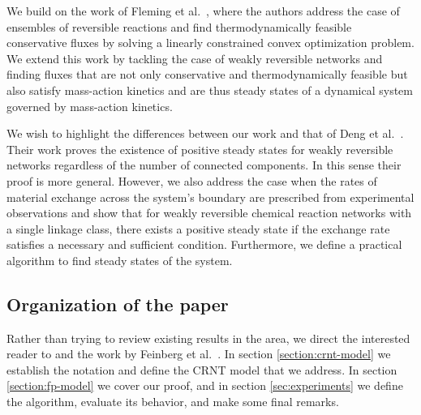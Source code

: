 \documentclass[smallextended]{svjour3}       %
\newcounter{sent}
\newcommand*{\0}{\mathbf{0}}
\newcommand*{\1}{\mathbf{1}}
\newcommand*{\R}{\mathbbm{R}}
\begin{document}
We build on the work of Fleming et al.\ \cite{fleming-opt}, where the authors
address the case of ensembles of reversible reactions and find
thermodynamically feasible conservative fluxes by solving a linearly 
constrained convex optimization problem. We extend this work by tackling the case
of weakly reversible networks and finding fluxes that are not only conservative
and thermodynamically feasible but also satisfy mass-action kinetics and 
are thus steady states of a dynamical system governed by mass-action kinetics.

We wish to highlight the differences between our work and that of Deng et al.\ 
\cite{Deng}. Their work proves the existence of positive steady states for 
weakly reversible networks regardless of the number of connected components.
In this sense their proof is more general. However, we
also address the case when the rates of material exchange across the system's 
boundary are prescribed from experimental observations and show that for weakly reversible chemical reaction
networks with a single linkage class, there exists a positive steady state if
the exchange rate satisfies a necessary and sufficient condition. Furthermore, we 
define a practical algorithm to find steady states of the system.

\subsection{Organization of the paper}

Rather than trying to review existing results in the area, we direct the 
interested reader to \cite{gunawardena,GMAK} and the work by Feinberg et al.\ 
\cite{deficiency0,deficiency1}. In section \ref{section:crnt-model} we establish
the notation and define the CRNT model that we address. In section
\ref{section:fp-model} we cover our proof, and in section \ref{sec:experiments}
we define the algorithm, evaluate its behavior, and make some final remarks.

%
%
\end{document}
